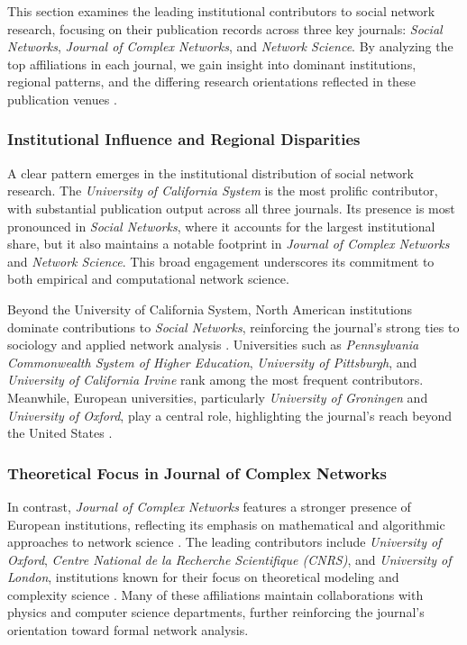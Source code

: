 \documentclass[twocolumn]{article}
\begin{document}
	This section examines the leading institutional contributors to social network research, focusing on their publication records across three key journals: \textit{Social Networks}, \textit{Journal of Complex Networks}, and \textit{Network Science}. By analyzing the top affiliations in each journal, we gain insight into dominant institutions, regional patterns, and the differing research orientations reflected in these publication venues \cite{Wagner2018, Glanzel2015, Leydesdorff2021}.
	
	\subsubsection*{Institutional Influence and Regional Disparities}
	
	A clear pattern emerges in the institutional distribution of social network research. The \textit{University of California System} is the most prolific contributor, with substantial publication output across all three journals. Its presence is most pronounced in \textit{Social Networks}, where it accounts for the largest institutional share, but it also maintains a notable footprint in \textit{Journal of Complex Networks} and \textit{Network Science}. This broad engagement underscores its commitment to both empirical and computational network science.
	
	Beyond the University of California System, North American institutions dominate contributions to \textit{Social Networks}, reinforcing the journal’s strong ties to sociology and applied network analysis \cite{moody2004sociology, Freeman2004}. Universities such as \textit{Pennsylvania Commonwealth System of Higher Education}, \textit{University of Pittsburgh}, and \textit{University of California Irvine} rank among the most frequent contributors. Meanwhile, European universities, particularly \textit{University of Groningen} and \textit{University of Oxford}, play a central role, highlighting the journal’s reach beyond the United States \cite{Borgatti2009}.
	
	\subsubsection*{Theoretical Focus in Journal of Complex Networks}
	
	In contrast, \textit{Journal of Complex Networks} features a stronger presence of European institutions, reflecting its emphasis on mathematical and algorithmic approaches to network science \cite{Newman2010}. The leading contributors include \textit{University of Oxford}, \textit{Centre National de la Recherche Scientifique (CNRS)}, and \textit{University of London}, institutions known for their focus on theoretical modeling and complexity science \cite{Barabasi2016}. Many of these affiliations maintain collaborations with physics and computer science departments, further reinforcing the journal’s orientation toward formal network analysis.
	
\end{document}
